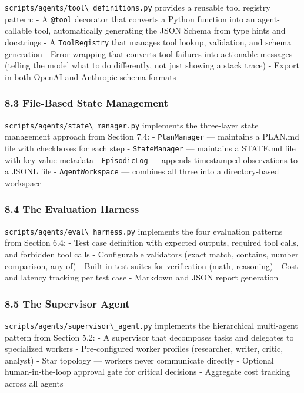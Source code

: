 \documentclass[11pt, a4paper]{article}
\newcommand{\passthrough}[1]{#1}
\begin{document}
\passthrough{\lstinline!scripts/agents/tool\_definitions.py!} provides a
reusable tool registry pattern: - A \passthrough{\lstinline!@tool!}
decorator that converts a Python function into an agent-callable tool,
automatically generating the JSON Schema from type hints and docstrings
- A \passthrough{\lstinline!ToolRegistry!} that manages tool lookup,
validation, and schema generation - Error wrapping that converts tool
failures into actionable messages (telling the model what to do
differently, not just showing a stack trace) - Export in both OpenAI and
Anthropic schema formats

\hypertarget{file-based-state-management}{%
\subsubsection{8.3 File-Based State
Management}\label{file-based-state-management}}

\passthrough{\lstinline!scripts/agents/state\_manager.py!} implements
the three-layer state management approach from Section 7.4: -
\passthrough{\lstinline!PlanManager!} --- maintains a PLAN.md file with
checkboxes for each step - \passthrough{\lstinline!StateManager!} ---
maintains a STATE.md file with key-value metadata -
\passthrough{\lstinline!EpisodicLog!} --- appends timestamped
observations to a JSONL file - \passthrough{\lstinline!AgentWorkspace!}
--- combines all three into a directory-based workspace

\hypertarget{the-evaluation-harness}{%
\subsubsection{8.4 The Evaluation
Harness}\label{the-evaluation-harness}}

\passthrough{\lstinline!scripts/agents/eval\_harness.py!} implements the
four evaluation patterns from Section 6.4: - Test case definition with
expected outputs, required tool calls, and forbidden tool calls -
Configurable validators (exact match, contains, number comparison,
any-of) - Built-in test suites for verification (math, reasoning) - Cost
and latency tracking per test case - Markdown and JSON report generation

\hypertarget{the-supervisor-agent}{%
\subsubsection{8.5 The Supervisor Agent}\label{the-supervisor-agent}}

\passthrough{\lstinline!scripts/agents/supervisor\_agent.py!} implements
the hierarchical multi-agent pattern from Section 5.2: - A supervisor
that decomposes tasks and delegates to specialized workers -
Pre-configured worker profiles (researcher, writer, critic, analyst) -
Star topology --- workers never communicate directly - Optional
human-in-the-loop approval gate for critical decisions - Aggregate cost
tracking across all agents
\end{document}
